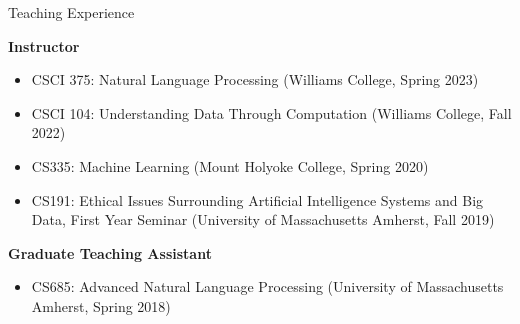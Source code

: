 \documentclass{resume} %
\begin{document}

\begin{rSection}{Teaching Experience}

\textbf{Instructor}
\begin{itemize}
  \item CSCI 375: Natural Language Processing (Williams College, Spring 2023)
  \item CSCI 104: Understanding Data Through Computation (Williams College, Fall 2022)
  \item CS335: Machine Learning (Mount Holyoke College, Spring 2020)
  \item CS191: Ethical Issues Surrounding Artificial Intelligence Systems and Big Data, First Year Seminar (University of Massachusetts Amherst, Fall 2019)

\end{itemize}

\textbf{Graduate Teaching Assistant}
\begin{itemize}
\item CS685: Advanced Natural Language Processing (University of Massachusetts Amherst, Spring 2018)
\end{itemize}






\end{rSection}
\end{document}
